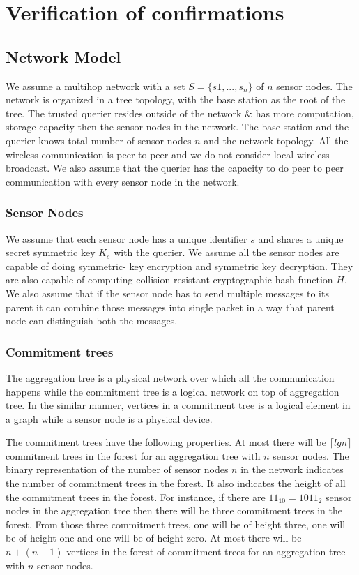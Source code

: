 \chapter{Verification of confirmations}

\section{Network Model}

We assume a multihop network with a set $ S = \{s1,...,s_{n}\} $ of $n$
sensor nodes. The network is organized in a tree topology, with the
base station as the root of the tree. The trusted querier resides
outside of the network \& has more computation, storage capacity 
then the sensor nodes in the network. The base station and the 
querier knows total number of sensor nodes $n$ and the network 
topology. All the wireless comuunication is peer-to-peer and we do 
not consider local wireless broadcast. We also assume that the
querier has the capacity to do peer to peer communication with 
every sensor node in the network.

\subsection{Sensor Nodes}

	We assume that each sensor node has a unique identifier $s$ and
	shares a unique secret symmetric key $K_{s}$ with the querier. 
	We assume all the sensor nodes are capable of doing symmetric-
	key encryption and symmetric key decryption. They are also
	capable of computing collision-resistant cryptographic hash 
	function $H$. We also assume that if the sensor node has to send 
	multiple messages to its parent it can combine those messages 
	into single packet in a way that parent node can distinguish both 
	the messages.

\subsection{Commitment trees} %
\label{sub:Commitment trees}
		
	The aggregation tree is a physical network over which all the
	communication happens while the commitment tree is a logical
	network on top of aggregation tree. In the similar manner, 
	vertices in a commitment tree is a logical element in a graph 
	while a sensor node is a physical device. 

	The commitment trees have the following properties. 
	At most there will be $\lceil lg  n \rceil$ commitment trees in the forest for an aggregation tree with $n$ sensor nodes.
	The binary representation of the number of sensor nodes $n$ in the network indicates the number of commitment trees in the forest. It also indicates the height of all the commitment trees in the forest. 
	For instance, if there are $ 11_{10} = 1011_{2} $ sensor nodes in the aggregation tree then there will be three commitment trees in the forest. From those three commitment trees, one will be of height three, one will be of height one and one will be of height zero.
	At most there will be $n + ( n - 1 )$ vertices in the forest of commitment trees for an aggregation tree with $n$ sensor 
	nodes.

